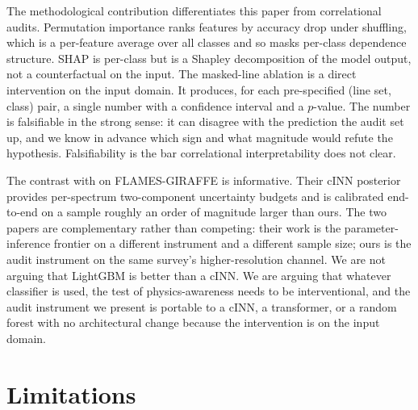 \documentclass[11pt,a4paper]{article}
\begin{document}
The methodological contribution differentiates this paper from correlational audits. Permutation importance ranks features by accuracy drop under shuffling, which is a per-feature average over all classes and so masks per-class dependence structure. SHAP is per-class but is a Shapley decomposition of the model output, not a counterfactual on the input. The masked-line ablation is a direct intervention on the input domain. It produces, for each pre-specified (line set, class) pair, a single number with a confidence interval and a $p$-value. The number is falsifiable in the strong sense: it can disagree with the prediction the audit set up, and we know in advance which sign and what magnitude would refute the hypothesis. Falsifiability is the bar correlational interpretability does not clear.

The contrast with \citet{2024A&A...692A.228C} on FLAMES-GIRAFFE is informative. Their cINN posterior provides per-spectrum two-component uncertainty budgets and is calibrated end-to-end on a sample roughly an order of magnitude larger than ours. The two papers are complementary rather than competing: their work is the parameter-inference frontier on a different instrument and a different sample size; ours is the audit instrument on the same survey's higher-resolution channel. We are not arguing that LightGBM is better than a cINN. We are arguing that whatever classifier is used, the test of physics-awareness needs to be interventional, and the audit instrument we present is portable to a cINN, a transformer, or a random forest with no architectural change because the intervention is on the input domain.

\section{Limitations}
\label{sec:limitations}
\end{document}
